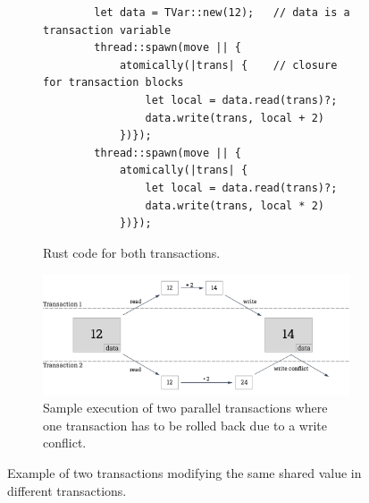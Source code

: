 \begin{figure}[h]
    \begin{subfigure}[h]{\textwidth}
    \begin{verbatim}
        let data = TVar::new(12);   // data is a transaction variable
        thread::spawn(move || {
            atomically(|trans| {    // closure for transaction blocks
                let local = data.read(trans)?;
                data.write(trans, local + 2)
            })});
        thread::spawn(move || {
            atomically(|trans| {
                let local = data.read(trans)?;
                data.write(trans, local * 2)
            })});
    \end{verbatim}
    \caption{Rust code for both transactions.}%
    \label{fig:background:stmcode}
    \end{subfigure}
    \begin{subfigure}[h]{\textwidth}
    \centering
    \includegraphics[width=.9\textwidth,keepaspectratio]{gfx/background-stm}
    \caption{Sample execution of two parallel transactions where one transaction has to be rolled back due to a write conflict.}%
    \label{fig:background:stmflow}
    \end{subfigure}
    \caption{Example of two transactions modifying the same shared value in different transactions.}%
    \label{fig:background:stm}
\end{figure}

